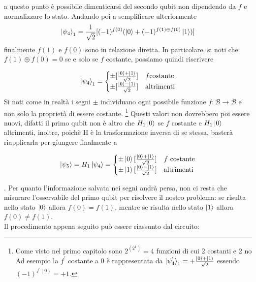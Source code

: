 \documentclass[12pt,a4paper,openright]{report}
\newcommand*\xor{\mathbin{\oplus}}
\begin{document}
\noindent a questo punto è possibile dimenticarsi del secondo qubit non dipendendo da $f$ e normalizzare lo stato. Andando poi a semplificare ulteriormente
\[
   \ket{\psi_4}_1 = \frac{1}{\sqrt2}[(-1)^{f(0)}(\ket0 + (-1)^{f(1) \xor f(0)}\ket{1} )]
\]
finalmente $f(1)$ e $ f(0)$ sono in relazione diretta. In particolare, si noti che: $f(1) \xor f(0)= 0$ se e solo se $f$ costante, possiamo quindi riscrivere

\[
    \ket{\psi_4}_1 =
    \begin{cases} 
        \pm [\frac{\ket0 + \ket1}{\sqrt2}] & f \text{costante}\\
        \pm [\frac{\ket0 - \ket1}{\sqrt2}] & \text{altrimenti}
    \end{cases}
 \]
 Si noti come in realtà i segni $\pm$ individuano ogni possibile funzione $f:\mathcal{B}\rightarrow \mathcal{B}$ e non solo la proprietà di essere costante. \footnote{Come visto nel primo capitolo sono $2^{(2^1)}=4$ funzioni di cui 2 costanti e 2 no Ad esempio la  $f^{'}$ costante a 0 è rappresentata da $ \ket{\psi_4^{'}}_1 = + \frac{\ket0 + \ket1}{\sqrt2}$ essendo $(-1)^{f^{'}(0)} = +1$.}
 Questi valori non dovrebbero poi essere nuovi, difatti il primo qubit non è altro che $H_1\ket0$ se $f$ costante e $H_1\ket0$ altrimenti, inoltre, poichè H è la trasformazione inversa di se stessa, basterà riapplicarla
 per giungere finalmente a
 
 \[
    \ket{\psi_5} = H_1\ket{\psi_4} = 
    \begin{cases} 
        \pm \ket0[\frac{\ket0 + \ket1}{\sqrt2}] & f \text{ costante}\\
        \pm \ket1[\frac{\ket0 - \ket1}{\sqrt2}] & \text{altrimenti}
    \end{cases}
 \]
 
 . Per quanto l'informazione salvata nei segni andrà persa, non ci resta che misurare l'osservabile del primo qubit per risolvere il nostro problema: se risulta nello stato $\ket0$ allora $f(0)=f(1)$, mentre se risulta nello stato  $\ket1$ allora $f(0) \neq f(1)$.\\ 
 Il procedimento appena seguito può essere riassunto dal circuito:
\end{document}

